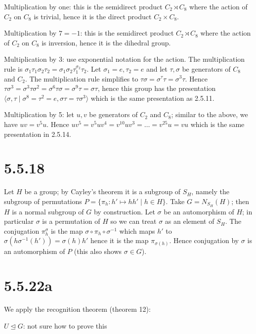 \documentclass{article}
\def\<{\langle}
\def\>{\rangle}
\def\inv{{-1}}
\begin{document}
Multiplication by one: this is the semidirect product $C_2 \rtimes C_8$ where the action of $C_2$ on $C_8$ is trivial, hence it is the direct product $C_2 \times C_8$.

Multiplication by $7 = -1$: this is the semidirect product $C_2 \rtimes C_8$ where the action of $C_2$ on $C_8$ is inversion, hence it is the dihedral group.

Multiplication by $3$: use exponential notation for the action. The multiplication rule is $\sigma_1 \tau_1 \sigma_2 \tau_2 = \sigma_1 \sigma_2 \tau_1^{\sigma_2} \tau_2$. Let $\sigma_1 = e, \tau_2 = e$ and let $\tau, \sigma$ be generators of $C_8$ and $C_2$. The multiplication rule simplifies to $\tau \sigma = \sigma^\tau \tau = \sigma^3 \tau$. Hence $\tau \sigma^3 = \sigma^3 \tau \sigma^2 = \sigma^6 \tau \sigma = \sigma^9 \tau = \sigma \tau$, hence this group has the presentation $\< \sigma, \tau \mid \sigma^8 = \tau^2 = e, \sigma \tau = \tau \sigma^3 \>$ which is the same presentation as 2.5.11.

Multiplication by 5: let $u, v$ be generators of $C_2$ and $C_8$; similar to the above, we have $u v = v^5 u$. Hence $u v^5 = v^5 u v^4 = v^{10} u v^3 = \ldots = v^{25} u = vu$ which is the same presentation in 2.5.14.

\section*{5.5.18}

Let $H$ be a group; by Cayley's theorem it is a subgroup of $S_H$, namely the subgroup of permutations $P = \{ \pi_h: h' \mapsto hh' \mid h \in H\}$. Take $G = N_{S_H}(H)$; then $H$ is a normal subgroup of $G$ by construction. Let $\sigma$ be an automorphism of $H$; in particular $\sigma$ is a permutation of $H$ so we can treat $\sigma$ as an element of $S_H$. The conjugation $\pi_h^\sigma$ is the map $\sigma \circ \pi_h \circ \sigma^\inv$ which maps $h'$ to $\sigma(h\sigma^\inv(h')) = \sigma(h) h'$ hence it is the map $\pi_{\sigma(h)}$. Hence conjugation by $\sigma$ is an automorphism of $P$ (this also shows $\sigma \in G$).

\section*{5.5.22a}

We apply the recognition theorem (theorem 12):

$U \trianglelefteq G$: not sure how to prove this
\end{document}
